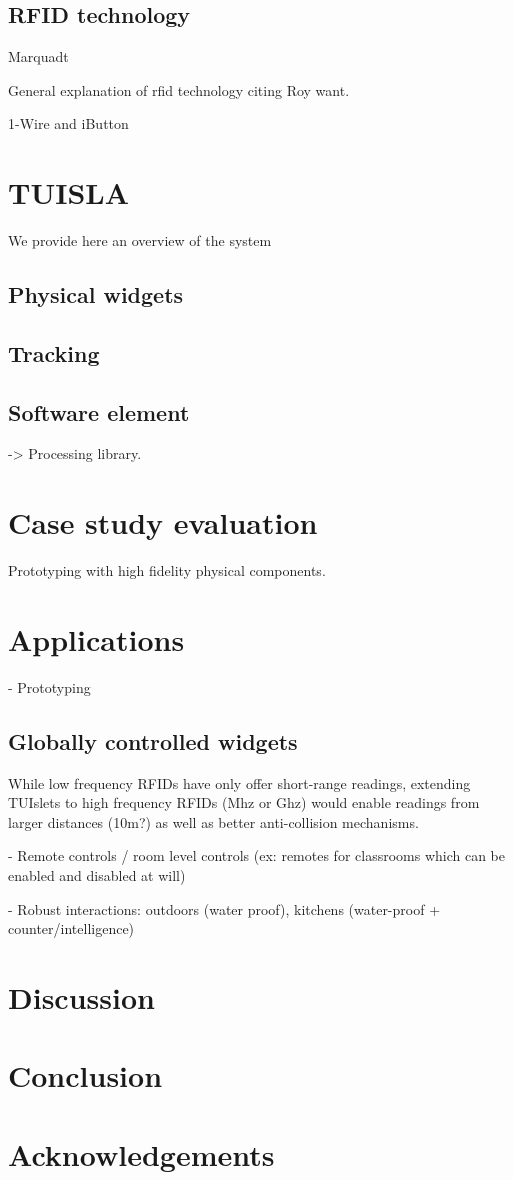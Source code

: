 \documentclass{ubicomp2013}
\begin{document}
\subsection{RFID technology}
Marquadt

General explanation of rfid technology citing Roy want.


1-Wire and iButton

\section{TUISLA}

We provide here an overview of the system

\subsection{Physical widgets}

\subsection{Tracking}

\subsection{Software element}
-> Processing library.

\section{Case study evaluation}
Prototyping with high fidelity physical components.


\section{Applications}

- Prototyping

\subsection{Globally controlled widgets}
While low frequency RFIDs have only offer short-range readings, extending TUIslets to high frequency RFIDs (Mhz or Ghz) would enable readings from larger distances (10m?) as well as better anti-collision mechanisms.

- Remote controls / room level controls (ex: remotes for classrooms which can be enabled and disabled at will)

- Robust interactions: outdoors (water proof), kitchens (water-proof + counter/intelligence)

\section{Discussion}

\section{Conclusion}

\section{Acknowledgements}




\end{document}
